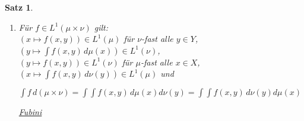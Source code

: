 \documentclass[11pt]{memoir}
\theoremstyle{changebreak}
\newtheorem{Satz}{Satz}[chapter]
\begin{document}
\begin{Satz}
\begin{enumerate}
	\item Für $f \in L^1(\mu \times \nu)$ gilt: \\
	$(x \mapsto f(x, y)) \in L^1(\mu)$ für $\nu$-fast alle $y \in Y$, \\
	$(y \mapsto \int f(x, y)\, d\mu(x)) \in L^1(\nu)$, \\
	$(y \mapsto f(x, y)) \in L^1(\nu)$ für $\mu$-fast alle $x \in X$, \\
	$(x \mapsto \int f(x, y) \, d\nu(y)) \in L^1(\mu)$ und
	\begin{center}
		$\int f \, d(\mu \times \nu) = \int \int f(x, y) \, d\mu(x)d\nu(y) = \int \int f(x, y) \, d\nu(y)d\mu(x)$
	\end{center}
	\emph{\underline{Fubini}}
\end{enumerate}
\end{Satz}
\end{document}
